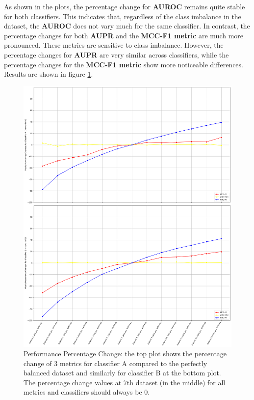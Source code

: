 \documentclass[12pt, oneside]{amsart}
\theoremstyle{definition}
\theoremstyle{remark}
\numberwithin{equation}{section}
\begin{document}
As shown in the plots, the percentage change for \textbf{AUROC} remains quite stable for both classifiers. This indicates that, regardless of the class imbalance in the dataset, the \textbf{AUROC} does not vary much for the same classifier. In contrast, the percentage changes for both \textbf{AUPR} and the \textbf{MCC-F1 metric} are much more pronounced. These metrics are sensitive to class imbalance. However, the percentage changes for \textbf{AUPR} are very similar across classifiers, while the percentage changes for the \textbf{MCC-F1 metric} show more noticeable differences. Results are shown in figure \ref{simulation2}.

\begin{figure}
    \centering
    \includegraphics[scale=0.27]{Report/Figure/simulation2.jpg}
    \caption{Performance Percentage Change: the top plot shows the percentage change of 3 metrics for classifier A compared to the perfectly balanced dataset and similarly for classifier B at the bottom plot. The percentage change values at 7th dataset (in the middle) for all metrics and classifiers should always be 0.}
    \label{simulation2}
\end{figure}
\FloatBarrier
\end{document}

